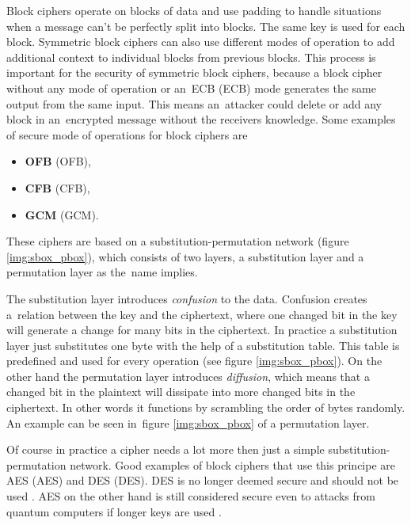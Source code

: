 Block ciphers operate on blocks of data and use padding to handle situations when a message can't be perfectly split into blocks. The same key is used for each block. Symmetric block ciphers can also use different modes of operation to add additional context to individual blocks from previous blocks. This process is important for the security of symmetric block ciphers, because a block cipher without any mode of operation or an~ECB (\acl{ECB}) mode generates the same output from the same input. This means an~attacker could delete or add any block in an~encrypted message without the receivers knowledge. Some examples of secure mode of operations for block ciphers are \cite{Paar2010}
\begin{itemize}
  \item \textbf{OFB} (\acl{OFB}),
  \item \textbf{CFB} (\acl{CFB}),
  \item \textbf{GCM} (\acl{GCM}).
\end{itemize}

These ciphers are based on a substitution-permutation network (figure \ref{img:sbox_pbox}), which consists of two layers, a substitution layer and a permutation layer as the~name implies.

The substitution layer introduces \textit{confusion} to the data. Confusion creates a~relation between the key and the ciphertext, where one changed bit in the key will generate a change for many bits in the ciphertext. In practice a substitution layer just substitutes one byte with the help of a substitution table. This table is predefined and used for every operation (see figure \ref{img:sbox_pbox}). On the other hand the permutation layer introduces \textit{diffusion}, which means that a changed bit in the plaintext will dissipate into more changed bits in the ciphertext. In other words it functions by scrambling the order of bytes randomly. An example can be seen in~figure \ref{img:sbox_pbox} of a permutation layer. \cite{Paar2010}\cite{Shannon1949}

Of course in practice a cipher needs a lot more then just a simple substitution-permutation network. Good examples of block ciphers that use this principe are AES (\acl{AES}) and DES (\acl{DES}). DES is no longer deemed secure and should not be used \cite{Barker2017}. AES on the other hand is still considered secure even to attacks from quantum computers if longer keys are used \cite{Chen2016}.

